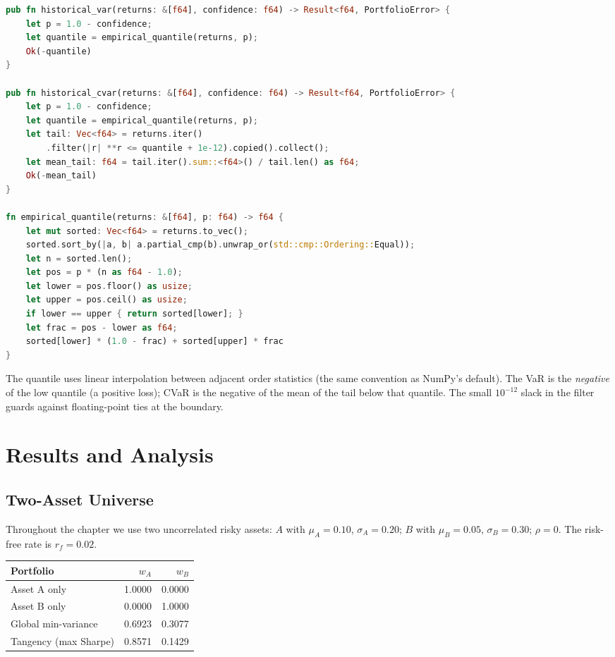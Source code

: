 \begin{lstlisting}[language=Rust]
pub fn historical_var(returns: &[f64], confidence: f64) -> Result<f64, PortfolioError> {
    let p = 1.0 - confidence;
    let quantile = empirical_quantile(returns, p);
    Ok(-quantile)
}

pub fn historical_cvar(returns: &[f64], confidence: f64) -> Result<f64, PortfolioError> {
    let p = 1.0 - confidence;
    let quantile = empirical_quantile(returns, p);
    let tail: Vec<f64> = returns.iter()
        .filter(|r| **r <= quantile + 1e-12).copied().collect();
    let mean_tail: f64 = tail.iter().sum::<f64>() / tail.len() as f64;
    Ok(-mean_tail)
}

fn empirical_quantile(returns: &[f64], p: f64) -> f64 {
    let mut sorted: Vec<f64> = returns.to_vec();
    sorted.sort_by(|a, b| a.partial_cmp(b).unwrap_or(std::cmp::Ordering::Equal));
    let n = sorted.len();
    let pos = p * (n as f64 - 1.0);
    let lower = pos.floor() as usize;
    let upper = pos.ceil() as usize;
    if lower == upper { return sorted[lower]; }
    let frac = pos - lower as f64;
    sorted[lower] * (1.0 - frac) + sorted[upper] * frac
}
\end{lstlisting}

The quantile uses linear interpolation between adjacent order
statistics (the same convention as NumPy's default). The VaR is the
\emph{negative} of the low quantile (a positive loss); CVaR is the
negative of the mean of the tail below that quantile. The small
$10^{-12}$ slack in the filter guards against floating-point ties at
the boundary.

\section{Results and Analysis}

\subsection{Two-Asset Universe}

Throughout the chapter we use two uncorrelated risky assets:
$A$ with $\mu_A = 0.10$, $\sigma_A = 0.20$; $B$ with $\mu_B = 0.05$,
$\sigma_B = 0.30$; $\rho = 0$. The risk-free rate is $r_f = 0.02$.

\begin{center}
\begin{tabular}{lrr}
\toprule
Portfolio & $w_A$ & $w_B$ \\
\midrule
Asset A only            & 1.0000 & 0.0000 \\
Asset B only            & 0.0000 & 1.0000 \\
Global min-variance     & 0.6923 & 0.3077 \\
Tangency (max Sharpe)   & 0.8571 & 0.1429 \\
\bottomrule
\end{tabular}
\end{center}

